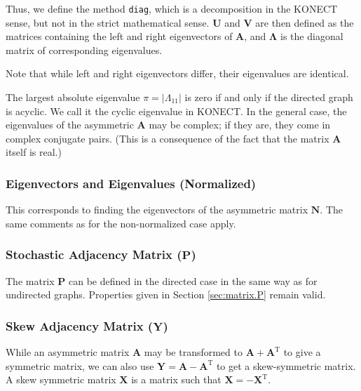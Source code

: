 \documentclass{article}
\begin{document}
Thus, we define the method \texttt{diag}, which is a decomposition in
the KONECT sense, but not in the strict mathematical sense. 
$\mathbf U$ and $\mathbf V$ are then defined as the matrices containing
the left and right eigenvectors of $\mathbf A$, and $\mathbf \Lambda$ is
the diagonal matrix of corresponding eigenvalues. 

Note that while left and right eigenvectors differ, their eigenvalues
are identical. 

The largest absolute eigenvalue $\pi=|\Lambda_{11}|$ is zero if and only
if the directed graph is acyclic.  We call it the cyclic eigenvalue in
KONECT.  
In the general case, the eigenvalues of the asymmetric $\mathbf A$ may
be complex; if they are, they come in complex conjugate pairs. (This is
a consequence of the fact that the matrix $\mathbf A$ itself is real.)

\subsubsection{Eigenvectors and Eigenvalues (Normalized)}
\label{sec:matrix.diag-n}
This corresponds to finding the eigenvectors of the asymmetric matrix
$\mathbf N$. 
The same comments as for the non-normalized case apply. 

\subsubsection{Stochastic Adjacency Matrix ($\mathbf P$)}
The matrix $\mathbf P$ can be defined in the directed case in the same
way as for undirected graphs.  Properties given in Section
\ref{sec:matrix.P} remain valid. 

\subsubsection{Skew Adjacency Matrix ($\mathbf Y$)}
\label{sec:matrix.skew}
While an asymmetric matrix $\mathbf A$ may be transformed to $\mathbf A
+ \mathbf A^{\mathrm T}$ to give a symmetric matrix, we can also use
$\mathbf Y = \mathbf A - \mathbf A^{\mathrm T}$ to get a skew-symmetric matrix.  A
skew symmetric matrix $\mathbf X$ is a matrix such that $\mathbf X =
-\mathbf X^{\mathrm T}$.
\end{document}

